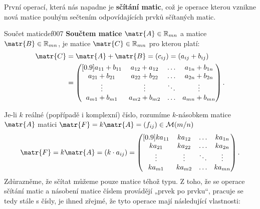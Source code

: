       První operací, která nás napadne je \textbf{sčítání matic}, což je operace kterou vznikne nová 
      matice pouhým sečtením odpovídajících prvků sčítaných matic. 
      \begin{mathdef}{Součet matic}{def007}
        \textbf{Součtem matice} \(\matr{A} \in \mathbb{R}_{mn}\) a matice \(\matr{B} \in 
        \mathbb{R}_{mn}\), je matice \(\matr{C} \in \mathbb{R}_{mn}\) pro kterou platí:
        \begin{gather*}
          \begin{aligned}
            \matr{C}  &=  \matr{A} + \matr{B} = (c_{ij}) = (a_{ij} + b_{ij}) \\
                      &=  \begin{pmatrix}[0.9]
                            a_{11} + b_{11}  & a_{12} + a_{12} & \ldots &  a_{1n} + b_{1n}\\
                            a_{21} + b_{21}  & a_{22} + b_{22} & \ldots &  a_{2n} + b_{2n}\\
                                \vdots       &     \vdots      & \ddots &      \vdots     \\
                            a_{m1} + b_{m1}  & a_{m2} + b_{m2} & \ldots &  a_{mn} + b_{mn}
                          \end{pmatrix}.
          \end{aligned}
        \end{gather*} 
      \end{mathdef}
      Je-li \(k\) reálné (popřípadě i komplexní) číslo, rozumíme \(k\)-násobkem matice \(\matr{A}\) 
      matici \(\matr{F} = k\matr{A} = (f_{ij})\in \mathcal{M}(m/n)\)
      \begin{equation*}
        \matr{F} = k\matr{A} = (k\cdot a_{ij}) = 
                    \begin{pmatrix}[0.9]
                       ka_{11} & ka_{12} & \ldots & ka_{1n} \\
                       ka_{21} & ka_{22} & \ldots & ka_{2n} \\
                       \vdots  & \vdots  & \ddots & \vdots  \\
                       ka_{m1} & ka_{m2} & \ldots & ka_{mn}
                    \end{pmatrix}.
      \end{equation*}
      Zdůrazněme, že sčítat můžeme pouze matice téhož typu. Z toho, že se operace sčítání matic a 
      násobení matice číslem provádějí „prvek po prvku“, pracuje se tedy stále s čísly, je ihned 
      zřejmé, že tyto operace mají následující vlastnosti:
      
